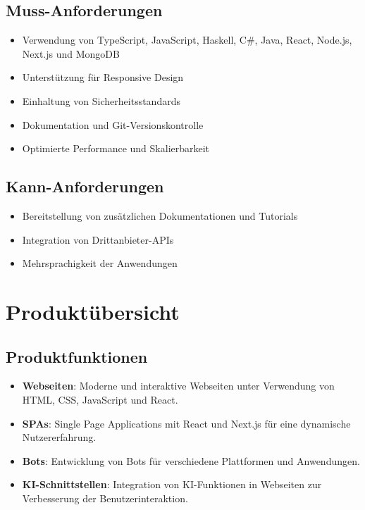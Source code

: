 \documentclass[a4paper,12pt]{article}
\begin{document}
\subsection{Muss-Anforderungen}
\begin{itemize}
    \item Verwendung von TypeScript, JavaScript, Haskell, C\#, Java, React, Node.js, Next.js und MongoDB
    \item Unterstützung für Responsive Design
    \item Einhaltung von Sicherheitsstandards
    \item Dokumentation und Git-Versionskontrolle
    \item Optimierte Performance und Skalierbarkeit
\end{itemize}

\subsection{Kann-Anforderungen}
\begin{itemize}
    \item Bereitstellung von zusätzlichen Dokumentationen und Tutorials
    \item Integration von Drittanbieter-APIs
    \item Mehrsprachigkeit der Anwendungen
\end{itemize}

\section{Produktübersicht}

\subsection{Produktfunktionen}
\begin{itemize}
    \item \textbf{Webseiten}: Moderne und interaktive Webseiten unter Verwendung von HTML, CSS, JavaScript und React.
    \item \textbf{SPAs}: Single Page Applications mit React und Next.js für eine dynamische Nutzererfahrung.
    \item \textbf{Bots}: Entwicklung von Bots für verschiedene Plattformen und Anwendungen.
    \item \textbf{KI-Schnittstellen}: Integration von KI-Funktionen in Webseiten zur Verbesserung der Benutzerinteraktion.
\end{itemize}
\end{document}
